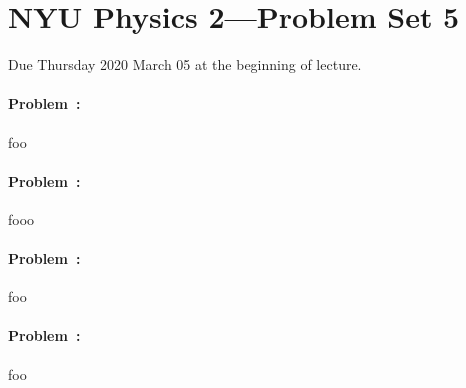 \documentclass[12pt]{article}
\begin{document}
\section*{NYU Physics 2---Problem Set 5}

Due Thursday 2020 March 05 at the beginning of lecture.

\paragraph{Problem~\theproblem:}%
foo

\paragraph{Problem~\theproblem:}%
fooo

\paragraph{Problem~\theproblem:}%
foo

\paragraph{Problem~\theproblem:}%
foo
\end{document}
